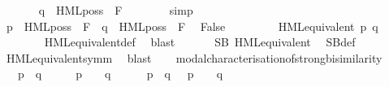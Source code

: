 \begin{isabellebody}
\ \ \ \ \isamarkupfalse%
\ {\isacartoucheopen}{\isasymnot}\ q\ {\isasymTurnstile}\ HML{\isacharunderscore}{\kern0pt}poss\ {\isasymalpha}\ {\isacharquery}{\kern0pt}F{\isacartoucheclose}\isanewline
\ \ \ \ \ \ \isamarkupfalse%
\ simp\isanewline
\ \ \isanewline
\ \ \ \ \isamarkupfalse%
\ {\isacartoucheopen}p\ {\isasymTurnstile}\ HML{\isacharunderscore}{\kern0pt}poss\ {\isasymalpha}\ {\isacharquery}{\kern0pt}F{\isacartoucheclose}\ {\isacartoucheopen}{\isasymnot}\ q\ {\isasymTurnstile}\ HML{\isacharunderscore}{\kern0pt}poss\ {\isasymalpha}\ {\isacharquery}{\kern0pt}F{\isacartoucheclose}\ \isamarkupfalse%
\ False\ \isanewline
\ \ \ \ \ \ \isamarkupfalse%
\ {\isacartoucheopen}HML{\isacharunderscore}{\kern0pt}equivalent\ p\ q{\isacartoucheclose}\ \isanewline
\ \ \ \ \ \ \isamarkupfalse%
\ HML{\isacharunderscore}{\kern0pt}equivalent{\isacharunderscore}{\kern0pt}def\ \isamarkupfalse%
\ blast\isanewline
\ \ \isacommand{{\isacharbraceright}{\kern0pt}}\isamarkupfalse%
\isanewline
\isanewline
\ \ \isamarkupfalse%
\ {\isacartoucheopen}SB\ HML{\isacharunderscore}{\kern0pt}equivalent{\isacartoucheclose}\ \isamarkupfalse%
\ SB{\isacharunderscore}{\kern0pt}def\ \isanewline
\ \ \ \ \isamarkupfalse%
\ HML{\isacharunderscore}{\kern0pt}equivalent{\isacharunderscore}{\kern0pt}symm\ \isamarkupfalse%
\ blast\isanewline
{}\isamarkupfalse%
\isanewline
\isanewline
\ \ \isanewline
{}\isamarkupfalse%
\ modal{\isacharunderscore}{\kern0pt}characterisation{\isacharunderscore}{\kern0pt}of{\isacharunderscore}{\kern0pt}strong{\isacharunderscore}{\kern0pt}bisimilarity{\isacharcolon}{\kern0pt}\ \isanewline
\ \ \ {\isacartoucheopen}p\ {\isasymleftrightarrow}\ q\ \ {\isasymLongleftrightarrow}\ \ {\isacharparenleft}{\kern0pt}{\isasymforall}\ {\isasymphi}{\isachardot}{\kern0pt}\ p\ {\isasymTurnstile}\ {\isasymphi}\ {\isasymlongleftrightarrow}\ q\ {\isasymTurnstile}\ {\isasymphi}{\isacharparenright}{\kern0pt}{\isacartoucheclose}\isanewline
{}\isamarkupfalse%
\isanewline
\ \ \isamarkupfalse%
\ {\isacartoucheopen}p\ {\isasymleftrightarrow}\ q\ {\isasymLongrightarrow}\ {\isasymforall}{\isasymphi}{\isachardot}{\kern0pt}\ {\isacharparenleft}{\kern0pt}p\ {\isasymTurnstile}\ {\isasymphi}{\isacharparenright}{\kern0pt}\ {\isacharequal}{\kern0pt}\ {\isacharparenleft}{\kern0pt}q\ {\isasymTurnstile}\ {\isasymphi}{\isacharparenright}{\kern0pt}{\isacartoucheclose}\isanewline

\end{isabellebody}
